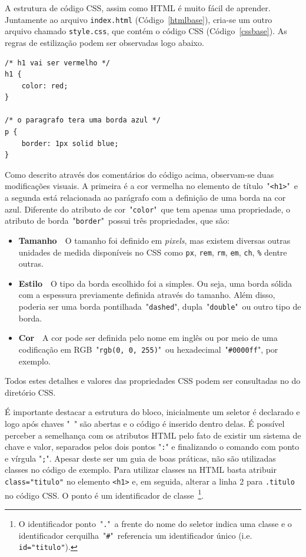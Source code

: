 A estrutura de código CSS, assim como HTML é muito fácil de aprender. Juntamente ao arquivo \texttt{index.html} (Código~\ref{htmlbase}), cria-se um outro arquivo chamado \texttt{style.css}, que contém o código CSS (Código~\ref{cssbase}). As regras de estilização podem ser observadas logo abaixo.
\begin{lstlisting}[label=cssbase,caption=Exemplo de um código CSS.]
/* h1 vai ser vermelho */
h1 {
    color: red;
}

/* o paragrafo tera uma borda azul */
p {
    border: 1px solid blue;
}
\end{lstlisting}

Como descrito através dos comentários do código acima, observam-se duas modificações visuais. A primeira é a cor vermelha no elemento de título~"\texttt{<h1>}"~e a segunda está relacionada ao parágrafo com a definição de uma borda na cor azul. Diferente do atributo de cor~"\texttt{color}"~que tem apenas uma propriedade, o atributo de borda~"\texttt{border}"~possui três propriedades, que são: 
\begin{itemize}
    \item \textbf{Tamanho}~\textemdash~O tamanho foi definido em \textit{pixels}, mas existem diversas outras unidades de medida disponíveis no CSS como \texttt{px}, \texttt{rem}, \texttt{rm}, \texttt{em}, \texttt{ch}, \texttt{\%} dentre outras.
    \item \textbf{Estilo}~\textemdash~O tipo da borda escolhido foi a simples. Ou seja, uma borda sólida com a espessura previamente definida através do tamanho. Além disso, poderia ser uma borda pontilhada~"\texttt{dashed}", dupla~"\texttt{double}"~ou outro tipo de borda.
    \item \textbf{Cor}~\textemdash~A cor pode ser definida pelo nome em inglês ou por meio de uma codificação em RGB~"\texttt{rgb(0, 0, 255)}"~ou hexadecimal~"\texttt{\#0000ff}", por exemplo.
\end{itemize}

Todos estes detalhes e valores das propriedades CSS podem ser consultadas no \textit{} do diretório CSS. 

É importante destacar a estrutura do bloco, inicialmente um seletor é declarado e logo após chaves "\texttt{{ }}" são abertas e o código é inserido dentro delas. É possível perceber a semelhança com os atributos HTML pelo fato de existir um sistema de chave e valor, separados pelos dois pontos "\texttt{:}" e finalizando o comando com ponto e vírgula "\texttt{;}". Apesar deste ser um guia de boas práticas, não são utilizadas classes no código de exemplo. Para utilizar classes na HTML basta atribuir \texttt{class="titulo"} no elemento \texttt{<h1>} e, em seguida, alterar a linha 2 para \texttt{.titulo} no código CSS. O ponto é um identificador de classe~\footnote{O identificador ponto~"\texttt{.}"~a frente do nome do seletor indica uma classe e o identificador cerquilha~"\texttt{\#}"~referencia um identificador único (i.e. \texttt{id="titulo"}).}.

